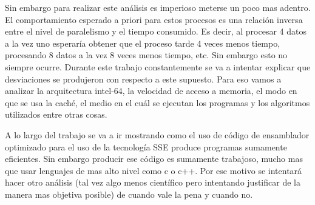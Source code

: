 	Sin embargo para realizar este análisis es imperioso meterse un poco mas adentro.
El comportamiento esperado a priori para estos procesos es una relación inversa entre
el nivel de paralelismo y el tiempo consumido. Es decir, al procesar 4 datos a la vez
uno esperaría obtener que el proceso tarde 4 veces menos tiempo, procesando 8 datos
a la vez 8 veces menos tiempo, etc. Sin embargo esto no siempre ocurre. Durante
este trabajo constantemente se va a intentar explicar que desviaciones se 
produjeron con respecto a este supuesto. Para eso vamos a analizar la arquitectura
intel-64, la velocidad de acceso a memoria, el modo en que se usa la caché,
el medio en el cuál se ejecutan los programas y los algoritmos utilizados entre
otras cosas.

	A lo largo del trabajo se va a ir mostrando como el uso de código de ensamblador
optimizado para el uso de la tecnología SSE produce programas sumamente eficientes. Sin embargo
producir ese código es sumamente trabajoso, mucho mas que usar lenguajes de mas alto nivel como
c o c++. Por ese motivo se intentará hacer otro análisis (tal vez algo menos científico
pero intentando justificar de la manera mas objetiva posible) de cuando vale la pena y cuando no.





	
